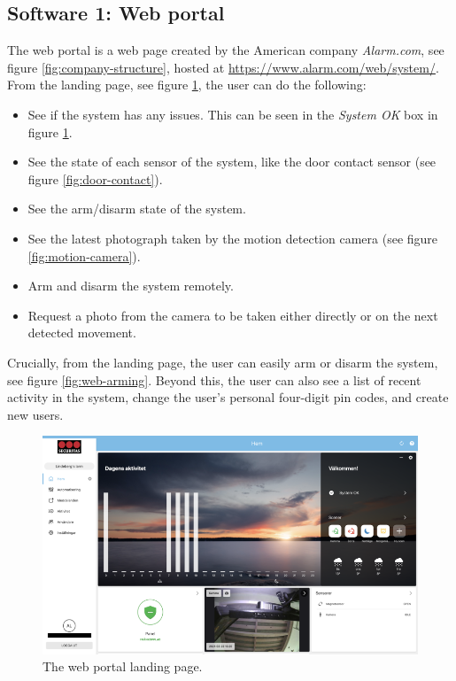 \subsection{Software 1: Web portal} \label{ch:system:web-portal}
The web portal is a web page created by the American company \textit{Alarm.com}, see figure \ref{fig:company-structure}, hosted at \url{https://www.alarm.com/web/system/}. From the landing page, see figure \ref{fig:web-landing-page}, the user can do the following:
\begin{itemize}
    \item See if the system has any issues. This can be seen in the \textit{System OK} box in figure \ref{fig:web-landing-page}.
    \item See the state of each sensor of the system, like the door contact sensor (see figure \ref{fig:door-contact}).
    \item See the arm/disarm state of the system.
    \item See the latest photograph taken by the motion detection camera (see figure \ref{fig:motion-camera}).
    \item Arm and disarm the system remotely.
    \item Request a photo from the camera to be taken either directly or on the next detected movement.
\end{itemize}
Crucially, from the landing page, the user can easily arm or disarm the system, see figure \ref{fig:web-arming}. Beyond this, the user can also see a list of recent activity in the system, change the user's personal four-digit pin codes, and create new users.
\begin{figure}[!ht]
    \centering
    \includegraphics[width=\textwidth]{images/3-system/landing-page-web.png}
    \caption{The web portal landing page.}
    \label{fig:web-landing-page}
\end{figure}
